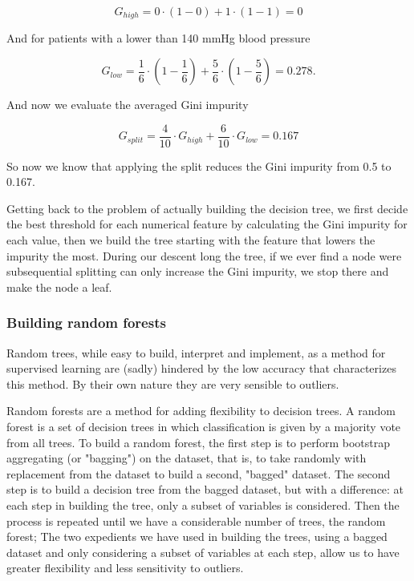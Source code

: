\documentclass[a4paper]{report}
\begin{document}
\begin{equation}
    G_{high} = 0 \cdot (1 -0) + 1 \cdot (1-1) = 0
\end{equation}

And for patients with a lower than 140 mmHg blood pressure

\begin{equation}
    G_{low} = \frac{1}{6} \cdot (1 - \frac{1}{6}) + \frac{5}{6} \cdot (1- \frac{5}{6}) = 0.278.
\end{equation}

And now we evaluate the averaged Gini impurity

\begin{equation}
    G_{split} = \frac{4}{10} \cdot G_{high} + \frac{6}{10} \cdot G_{low} = 0.167
\end{equation}

So now we know that applying the split reduces the Gini impurity from 0.5 to 0.167.

Getting back to the problem of actually building the decision tree, we first decide the best threshold for each numerical feature by calculating the Gini impurity for each value, then we build the tree starting with the feature that lowers the impurity the most.
During our descent long the tree, if we ever find a node were subsequential splitting can only increase the Gini impurity, we stop there and make the node a leaf.

\subsubsection{Building random forests}
Random trees, while easy to build, interpret and implement, as a method for supervised learning are (sadly) hindered by the low accuracy that characterizes this method.
By their own nature they are very sensible to outliers.

Random forests are a method for adding flexibility to decision trees.
A random forest is a set of decision trees in which classification is given by a majority vote from all trees.
To build a random forest, the first step is to perform bootstrap aggregating (or "bagging") on the dataset, that is, to take randomly with replacement from the dataset to build a second, "bagged" dataset.
The second step is to build a decision tree from the bagged dataset, but with a difference:
at each step in building the tree, only a subset of variables is considered.
Then the process is repeated until we have a considerable number of trees, the random forest;
The two expedients we have used in building the trees, using a bagged dataset and only considering a subset of variables at each step, allow us to have greater flexibility and less sensitivity to outliers.
\end{document}
